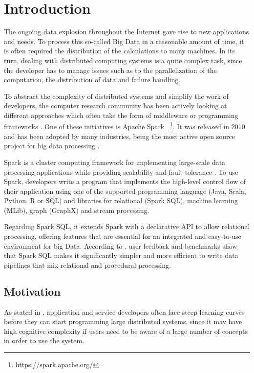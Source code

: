 \chapter{Introduction}

The ongoing data explosion throughout the Internet gave rise to new applications and needs. To process this so-called Big Data in a reasonable amount of time, it is often required the distribution of the calculations to many machines. In its turn, dealing with distributed computing systems is a quite complex task, since the developer has to manage issues such as to the parallelization of the computation, the distribution of data and failure handling.

To abstract the complexity of distributed systems and simplify the work of developers, the computer research community has been actively looking at different approaches which often take the form of middleware or programming frameworks \cite{ranganathan2007complexity}. One of these initiatives is Apache Spark ~\footnote{https://spark.apache.org/}. It was released in 2010 and has been adopted by many industries, being the most active open source project for big data processing \cite{armbrust2015sparksql}. 

Spark is a cluster computing framework for implementing large-scale data processing applications while providing scalability and fault tolerance \cite{zaharia2010spark}. To use Spark, developers write a program that implements the high-level control flow of their application using one of the supported programming language (Java, Scala, Python, R or SQL) and libraries for relational (Spark SQL), machine learning (MLib), graph (GraphX) and stream processing.

Regarding Spark SQL, it extends Spark with a declarative API to allow relational processing, offering features that are essential for an integrated and easy-to-use environment for big Data. According to \cite{armbrust2015sparksql}, user feedback and benchmarks show that Spark SQL makes it significantly simpler and more efficient to write data pipelines that mix relational and procedural processing.

\section{Motivation}

As stated in \cite{ranganathan2007complexity}, application and service developers often face steep learning curves before they can start programming large distributed systems, since it may have high cognitive complexity if users need to be aware of a large number of concepts in order to use the system. 

